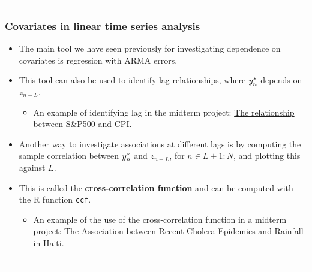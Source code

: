\documentclass[]{article}
\providecommand{\tightlist}{%
  \setlength{\itemsep}{0pt}\setlength{\parskip}{0pt}}
\begin{document}
\begin{center}\rule{0.5\linewidth}{\linethickness}\end{center}

\subsubsection{Covariates in linear time series
analysis}\label{covariates-in-linear-time-series-analysis}

\begin{itemize}
\item
  The main tool we have seen previously for investigating dependence on
  covariates is regression with ARMA errors.
\item
  This tool can also be used to identify lag relationships, where
  \(y_{n}^*\) depends on \(z_{n-L}\).

  \begin{itemize}
  \tightlist
  \item
    An example of identifying lag in the midterm project:
    \href{https://ionides.github.io/531w16/midterm_project/project20/midterm.html\#try-other-lags}{The
    relationship between S\&P500 and CPI}.
  \end{itemize}
\item
  Another way to investigate associations at different lags is by
  computing the sample correlation between \(y_n^*\) and
  \(z_{n-L}\), for \(n\in L+1:N\), and plotting this against \(L\).
\item
  This is called the \textbf{cross-correlation function} and can be
  computed with the R function \texttt{ccf}.

  \begin{itemize}
  \tightlist
  \item
    An example of the use of the cross-correlation function in a midterm
    project:
    \href{https://ionides.github.io/531w16/midterm_project/project3/midterm_project.html}{The
    Association between Recent Cholera Epidemics and Rainfall in Haiti}.
  \end{itemize}
\end{itemize}

\begin{center}\rule{0.5\linewidth}{\linethickness}\end{center}

\begin{center}\rule{0.5\linewidth}{\linethickness}\end{center}
\end{document}
